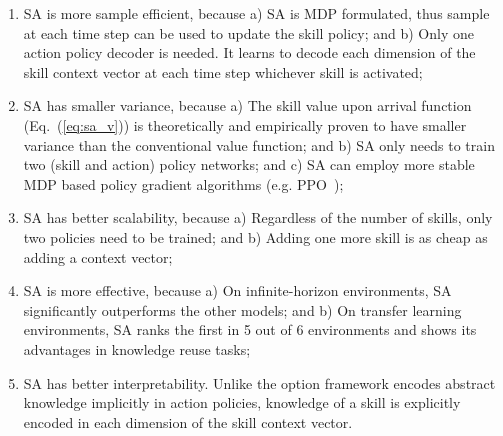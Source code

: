 \begin{enumerate}
\item SA is more sample efficient, because a) SA is MDP
  formulated, thus sample at each time step can be used to update
  the skill policy; and b) Only one action policy decoder is
  needed. It learns to decode each dimension of the skill context
  vector at each time step whichever skill is activated;
\item SA has smaller variance, because a) The skill value upon
  arrival function (Eq.~(\ref{eq:sa_v})) is theoretically and
  empirically proven to have smaller variance than the
  conventional value function; and b) SA only needs to train two
  (skill and action) policy networks; and c) SA can employ more
  stable MDP based policy gradient algorithms (e.g.
  PPO~\cite{schulman2017proximal});
\item SA has better scalability, because a) Regardless of the
  number of skills, only two policies need to be trained; and b)
  Adding one more skill is as cheap as adding a context vector;
\item SA is more effective, because a) On infinite-horizon
  environments, SA significantly outperforms the other models;
  and b) On transfer learning environments, SA ranks the first in
  5 out of 6 environments and shows its advantages in knowledge
  reuse tasks;
\item SA has better interpretability. Unlike the option framework
  encodes abstract knowledge implicitly in action policies,
  knowledge of a skill is explicitly encoded in each dimension of
  the skill context vector.
\end{enumerate}







